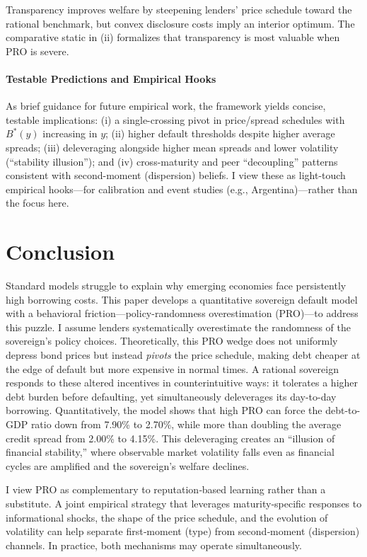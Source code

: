 \documentclass[12pt]{article}
\theoremstyle{plain}
\begin{document}
Transparency improves welfare by steepening lenders' price schedule toward the
rational benchmark, but convex disclosure costs imply an interior optimum. The
comparative static in (ii) formalizes that transparency is most valuable when
PRO is severe.

\paragraph{Testable Predictions and Empirical Hooks}
As brief guidance for future empirical work, the framework yields concise,
testable implications: (i) a single-crossing pivot in price/spread schedules
with $B^*(y)$ increasing in $y$; (ii) higher default thresholds despite higher
average spreads; (iii) deleveraging alongside higher mean spreads and lower
volatility (``stability illusion''); and (iv) cross-maturity and peer
``decoupling'' patterns consistent with second-moment (dispersion) beliefs. I
view these as light-touch empirical hooks—for calibration and event studies
(e.g., Argentina)—rather than the focus here.

\section{Conclusion}

Standard models struggle to explain why emerging economies face persistently
high borrowing costs. This paper develops a quantitative sovereign default
model with a behavioral friction---policy-randomness overestimation (PRO)---to
address this puzzle. I assume lenders systematically overestimate the
randomness of the sovereign's policy choices. Theoretically, this PRO wedge
does not uniformly depress bond prices but instead \textit{pivots} the price
schedule, making debt cheaper at the edge of default but more expensive in
normal times. A rational sovereign responds to these altered incentives in
counterintuitive ways: it tolerates a higher debt burden before defaulting, yet
simultaneously deleverages its day-to-day borrowing. Quantitatively, the model
shows that high PRO can force the debt-to-GDP ratio down from 7.90\% to 2.70\%,
while more than doubling the average credit spread from 2.00\% to 4.15\%. This
deleveraging creates an ``illusion of financial stability,'' where observable
market volatility falls even as financial cycles are amplified and the
sovereign's welfare declines.

I view PRO as complementary to reputation‑based learning rather than a
substitute. A joint empirical strategy that leverages maturity‑specific
responses to informational shocks, the shape of the price schedule, and the
evolution of volatility can help separate first‑moment (type) from
second‑moment (dispersion) channels. In practice, both mechanisms may operate
simultaneously.
\end{document}
